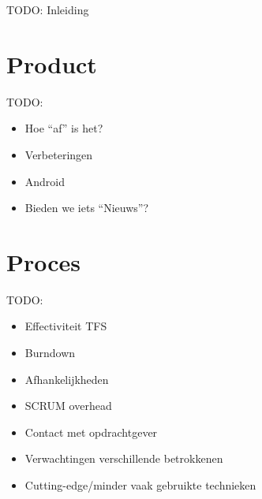 {\par \bigskip \par \color{red} TODO: Inleiding \par \bigskip \par }

\section{Product}

{\par \bigskip \par \color{red}
TODO: 
\begin{itemize}
\item Hoe ``af'' is het?
\item Verbeteringen
\item Android
\item Bieden we iets ``Nieuws''?
\end{itemize}
\par \bigskip \par }

\section{Proces}

{\par \bigskip \par \color{red}
TODO: 
\begin{itemize}
\item Effectiviteit TFS
\item Burndown
\item Afhankelijkheden
\item SCRUM overhead
\item Contact met opdrachtgever
\item Verwachtingen verschillende betrokkenen
\item Cutting-edge/minder vaak gebruikte technieken
\end{itemize}
\par \bigskip \par }